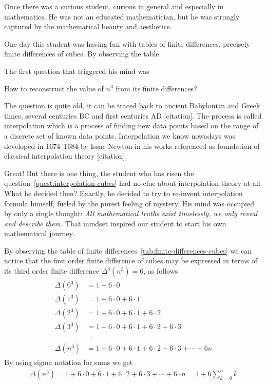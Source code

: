 Once there was a curious student, curious in general and especially in mathematics.
He was not an educated mathematician, but he was strongly captured by the mathematical
beauty and aesthetics.

One day this student was having fun with tables of finite differences, precisely finite differences of cubes.
By observing the table

The first question that triggered his mind was
\begin{question}
    \label{quest:interpolation-cubes}
    How to reconstruct the value of $n^3$ from its finite differences?
\end{question}
The question is quite old, it can be traced back to ancient Babylonian and Greek times,
several centuries BC and first centuries AD [citation].
The process is called interpolation which is a process
of finding new data points based on the range of a discrete set
of known data points.
Interpolation we know nowadays was developed in 1674--1684 by Issac Newton
in his works referenced as foundation of classical interpolation theory [citation].

Great!
But there is one thing, the student who has risen the question~\eqref{quest:interpolation-cubes}
had no clue about interpolation theory at all.
What he decided then?
Exactly, he decided to try to re-invent interpolation formula himself,
fueled by the purest feeling of mystery.
His mind was occupied by only a single thought:
\textit{
    All mathematical truths exist timelessly, we only reveal and describe them.
}
That mindset inspired our student to start his own mathematical journey.

By observing the table of finite differences~\eqref{tab:finite-differences-cubes} we can notice that
the first order finite difference of cubes may be expressed in terms of its
third order finite difference $\Delta^3(n^3) = 6$, as follows
\begin{align*}
    \begin{split}
        \Delta(0^3) &= 1+6 \cdot 0 \\
        \Delta(1^3) &= 1+6\cdot0+6\cdot1 \\
        \Delta(2^3) &= 1+6\cdot0+6\cdot1+6\cdot2 \\
        \Delta(3^3) &= 1+6\cdot0+6\cdot1+6\cdot2+6\cdot3 \\
        &\; \; \vdots \\
        \Delta(n^3) &= 1+6\cdot0+6\cdot1+6\cdot2+6\cdot3 + \cdots + 6n
    \end{split}
\end{align*}
By using sigma notation for sums we get
\begin{align*}
    \Delta(n^3) = 1+6\cdot0+6\cdot1+6\cdot2+6\cdot3+\cdots+6\cdot n = 1 + 6 \sum_{k=0}^{n} k
\end{align*}

